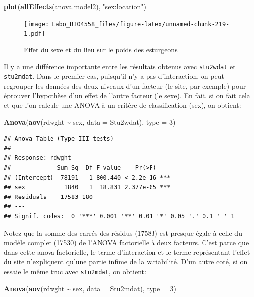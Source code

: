 \documentclass[
  12pt,
]{book}
\newenvironment{Shaded}{\begin{snugshade}}{\end{snugshade}}
\newcommand{\DataTypeTok}[1]{\textcolor[rgb]{0.13,0.29,0.53}{#1}}
\newcommand{\DecValTok}[1]{\textcolor[rgb]{0.00,0.00,0.81}{#1}}
\newcommand{\KeywordTok}[1]{\textcolor[rgb]{0.13,0.29,0.53}{\textbf{#1}}}
\newcommand{\NormalTok}[1]{#1}
\newcommand{\OperatorTok}[1]{\textcolor[rgb]{0.81,0.36,0.00}{\textbf{#1}}}
\newcommand{\StringTok}[1]{\textcolor[rgb]{0.31,0.60,0.02}{#1}}
\begin{document}
\begin{Shaded}
\begin{Highlighting}[]
\KeywordTok{plot}\NormalTok{(}\KeywordTok{allEffects}\NormalTok{(anova.model2), }\StringTok{"sex:location"}\NormalTok{)}
\end{Highlighting}
\end{Shaded}

\begin{figure}
\centering
\texttt{[image: Labo\_BIO4558\_files/figure-latex/unnamed-chunk-219-1.pdf]}
\caption{\label{fig:unnamed-chunk-219}Effet du sexe et du lieu sur le poids des esturgeons}
\end{figure}

Il y a une différence importante entre les résultats obtenus avec \texttt{stu2wdat} et \texttt{stu2mdat}. Dans le premier cas, puisqu'il n'y a pas d'interaction, on peut regrouper les données des deux niveaux d'un facteur (le site, par exemple) pour éprouver l'hypothèse d'un effet de l'autre facteur (le sexe). En fait, si on fait cela et que l'on calcule une ANOVA à un critère de classification (sex), on obtient:

\begin{Shaded}
\begin{Highlighting}[]
\KeywordTok{Anova}\NormalTok{(}\KeywordTok{aov}\NormalTok{(rdwght }\OperatorTok{\textasciitilde{}}\StringTok{ }\NormalTok{sex, }\DataTypeTok{data =}\NormalTok{ Stu2wdat), }\DataTypeTok{type =} \DecValTok{3}\NormalTok{)}
\end{Highlighting}
\end{Shaded}

\begin{verbatim}
## Anova Table (Type III tests)
## 
## Response: rdwght
##             Sum Sq  Df F value    Pr(>F)    
## (Intercept)  78191   1 800.440 < 2.2e-16 ***
## sex           1840   1  18.831 2.377e-05 ***
## Residuals    17583 180                      
## ---
## Signif. codes:  0 '***' 0.001 '**' 0.01 '*' 0.05 '.' 0.1 ' ' 1
\end{verbatim}

Notez que la somme des carrés des résidus (17583) est presque égale à celle du modèle complet (17530) de l'ANOVA factorielle à deux facteurs. C'est parce que dans cette anova factorielle, le terme d'interaction et le terme représentant l'effet du site n'expliquent qu'une partie infime de la variabilité. D'un autre coté, si on essaie le même truc avec \texttt{stu2mdat}, on obtient:

\begin{Shaded}
\begin{Highlighting}[]
\KeywordTok{Anova}\NormalTok{(}\KeywordTok{aov}\NormalTok{(rdwght }\OperatorTok{\textasciitilde{}}\StringTok{ }\NormalTok{sex, }\DataTypeTok{data =}\NormalTok{ Stu2mdat), }\DataTypeTok{type =} \DecValTok{3}\NormalTok{)}
\end{Highlighting}
\end{Shaded}
\end{document}

